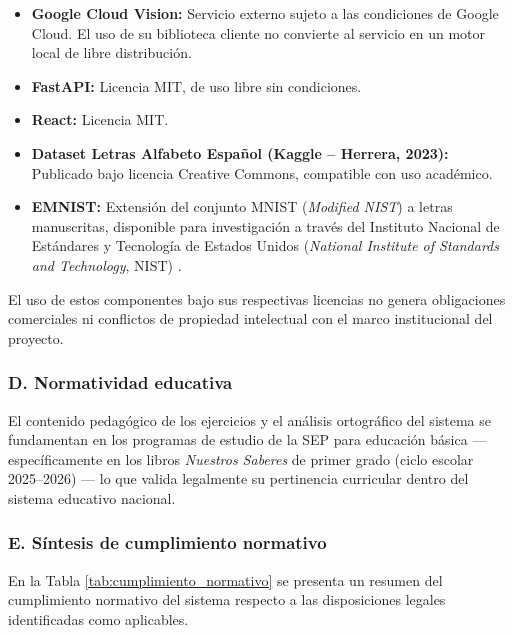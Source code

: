 \begin{itemize}
    \item \textbf{Google Cloud Vision:} Servicio externo sujeto a las condiciones de Google Cloud. El uso de su biblioteca cliente no convierte al servicio en un motor local de libre distribución.
    \item \textbf{FastAPI:} Licencia MIT, de uso libre sin condiciones.
    \item \textbf{React:} Licencia MIT.
    \item \textbf{Dataset Letras Alfabeto Español (Kaggle – Herrera, 2023):} Publicado bajo licencia Creative Commons, compatible con uso académico.
    \item \textbf{EMNIST:} Extensión del conjunto MNIST (\textit{Modified NIST}) a letras manuscritas, disponible para investigación a través del Instituto Nacional de Estándares y Tecnología de Estados Unidos (\textit{National Institute of Standards and Technology}, NIST) \cite{cohen2017emnist}.
\end{itemize}

El uso de estos componentes bajo sus respectivas licencias no genera obligaciones comerciales ni conflictos de propiedad intelectual con el marco institucional del proyecto.

\subsubsection*{D. Normatividad educativa}
El contenido pedagógico de los ejercicios y el análisis ortográfico del sistema se fundamentan en los programas de estudio de la SEP para educación básica — específicamente en los libros \textit{Nuestros Saberes} de primer grado (ciclo escolar 2025–2026) \cite{sep2024saberes1} — lo que valida legalmente su pertinencia curricular dentro del sistema educativo nacional.

\subsubsection*{E. Síntesis de cumplimiento normativo}
En la Tabla \ref{tab:cumplimiento_normativo} se presenta un resumen del cumplimiento normativo del sistema respecto a las disposiciones legales identificadas como aplicables.

